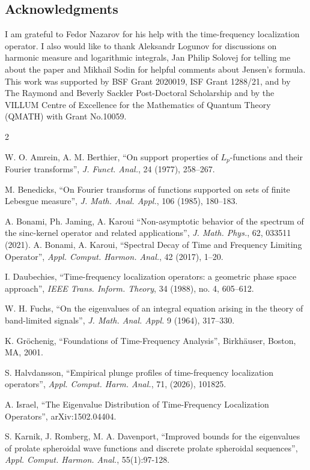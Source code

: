 \documentclass[12pt]{amsart}
\numberwithin{equation}{section}
\begin{document}
\subsection*{Acknowledgments} 
I am grateful to Fedor Nazarov for his help with the time-frequency localization operator. I also would like to thank Aleksandr Logunov for discussions on harmonic measure and logarithmic integrals, Jan Philip Solovej for telling me about the paper \cite{Lieb} and Mikhail Sodin for helpful comments about Jensen's formula. This work was supported by BSF Grant 2020019, ISF Grant 1288/21, and by The Raymond and Beverly Sackler Post-Doctoral Scholarship and by the VILLUM Centre of Excellence for the Mathematics of Quantum Theory (QMATH) with Grant No.10059.
\begin{thebibliography}{2}

W. O. Amrein, A. M.  Berthier,
``On support properties of $L_p$-functions and their Fourier transforms'',
{\em J. Funct. Anal.}, 24 (1977), 258--267.

 M. Benedicks,
``On Fourier transforms of functions supported on sets of finite Lebesgue measure'',
{\em J. Math. Anal. Appl.}, 106 (1985), 180--183.

 A. Bonami, Ph. Jaming, A. Karoui ``Non-asymptotic behavior of the spectrum of the sinc-kernel operator and related applications'', {\em J. Math. Phys.}, 62, 033511 (2021).
 A. Bonami, A. Karoui, ``Spectral Decay of Time and Frequency Limiting Operator'', {\em Appl. Comput. Harmon. Anal.}, 42 (2017), 1–20.

 I. Daubechies, ``Time-frequency localization operators: a geometric phase space
approach'', {\em IEEE Trans. Inform. Theory}, 34 (1988), no. 4, 605–612.

 W. H. Fuchs, ``On the eigenvalues of an integral equation arising in the theory of band-limited signals'', {\em J. Math. Anal. Appl.} 9 (1964), 317–330.

 K. Gr\"ochenig, ``Foundations of Time-Frequency Analysis'', Birkh\"auser, Boston, MA, 2001. 

 S. Halvdansson, ``Empirical plunge profiles of time-frequency localization operators'', {\em Appl. Comput. Harm. Anal.}, 71, (2026), 101825.

 A. Israel, ``The Eigenvalue Distribution of Time-Frequency Localization Operators'', arXiv:1502.04404.

 S. Karnik, J. Romberg, M. A. Davenport, ``Improved bounds for the eigenvalues of prolate spheroidal wave functions and discrete prolate spheroidal sequences'', {\em Appl. Comput. Harmon. Anal.}, 55(1):97-128.


\end{thebibliography}
\end{document}
